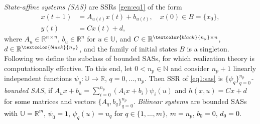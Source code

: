 \documentclass[journal,twoside,web]{ieeecolor}
\begin{document}
\emph{State-affine systems (SAS) \cite{Son:Real}} are SSRs \eqref{gen:eq1} of the form
\begin{equation}
\label{eq1:sas}
\begin{split}
 x(t+1)&= A_{u(t)}x(t)+b_{u(t)}, \quad  x(0) \in B=\{x_0\}, \\
 y(t) &= Cx(t)+d,
\end{split}
\end{equation}
where $A_u \in \mathbb{R}^{n \times n}$, $b_u \in \mathbb{R}^{n}$ for $u \in \mathbb{U}$, and
$C \in \mathbb{R}^{\textcolor{black}{n_y} \times n}$, $d \in \mathbb{R}^{\textcolor{black}{n_y}}$, and the family of initial states $B$ is a singleton.
Following \cite{Son:Real} we define the subclass of bounded  SASs, for 
which realization theory is computationally effective.  To this end, 
let $0 < n_p \in \mathbb{N}$ %
and consider $n_p+1$
linearly independent  functions $\psi_{q}:\mathbb{U} \rightarrow \mathbb{R}$, 
$q=0,\ldots,n_p$. %
Then  SSR of \eqref{eq1:sas} is \emph{$\{\psi_q\}_{q=0}^{n_p}$-bounded SAS}, if 
$A_ux+b_u\!\!=\!\!\sum_{i=0}^{n_p} (A_ix+b_i) \psi_i(u)$ and  $h(x,u)\!\!=\!\!Cx+d$
for \textcolor{black}{some} matrices and vectors 
$\{A_q,b_q\}_{q=0}^{n_p}$.
\emph{Bilinear systems \cite{isi:tac}} are bounded SASs 
\textcolor{black}{with $\mathbb{U}=\mathbb{R}^{m}$, $\psi_0=1$, $\psi_q(u)=u_q$ for $q \in \{1,\ldots,m\}$, $m=n_p$, $b_0=0$, $d_0=0$.}
\end{document}
